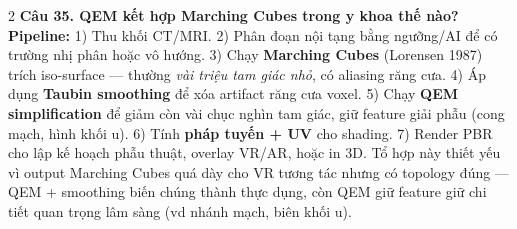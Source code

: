 \begin{paracol}{2}
\textbf{Câu 35. QEM kết hợp Marching Cubes trong y khoa thế nào?}\\
\textbf{Pipeline:} 1) Thu khối CT/MRI. 2) Phân đoạn nội tạng bằng ngưỡng/AI để có trường nhị phân hoặc vô hướng. 3) Chạy \textbf{Marching Cubes} (Lorensen 1987) trích iso-surface — thường \textit{vài triệu tam giác nhỏ}, có aliasing răng cưa. 4) Áp dụng \textbf{Taubin smoothing} để xóa artifact răng cưa voxel. 5) Chạy \textbf{QEM simplification} để giảm còn vài chục nghìn tam giác, giữ feature giải phẫu (cong mạch, hình khối u). 6) Tính \textbf{pháp tuyến + UV} cho shading. 7) Render PBR cho lập kế hoạch phẫu thuật, overlay VR/AR, hoặc in 3D. Tổ hợp này thiết yếu vì output Marching Cubes quá dày cho VR tương tác nhưng có topology đúng — QEM + smoothing biến chúng thành thực dụng, còn QEM giữ feature giữ chi tiết quan trọng lâm sàng (vd nhánh mạch, biên khối u).

\end{paracol}
